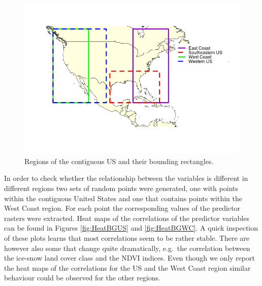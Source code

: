 \begin{figure}[!htb]
\centering
\includegraphics[scale=0.6]{Plots/StudyExtent.png}
\caption{\label{fig:studyExtent}Regions of the contiguous US and their bounding rectangles.}
\end{figure}

In order to check whether the relationship between the variables is different in different regions two sets of random points were generated, one with points within the contiguous United States and one that contains points within the West Coast region. For each point the corresponding values of the predictor rasters were extracted. Heat maps of the correlations of the predictor variables can be found in Figures \ref{fig:HeatBGUS} and \ref{fig:HeatBGWC}. A quick inspection of these plots learns that most correlations seem to be rather stable. There are however also some that change quite dramatically, e.g.\ the correlation between the ice-snow land cover class and the NDVI indices. Even though we only report the heat maps of the correlations for the US and the West Coast region similar behaviour could be observed for the other regions. \\

